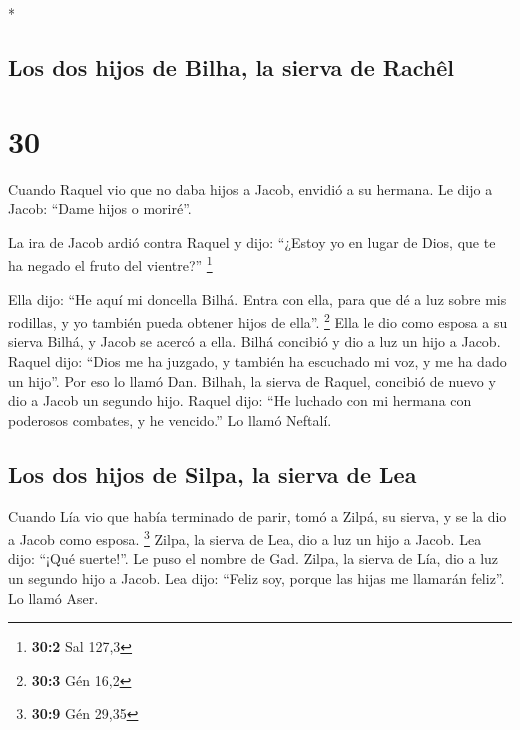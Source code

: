\begin{paracol}{2}
\begin{otherlanguage}{english}
\end{otherlanguage}

\switchcolumn[0]*

\hypertarget{los-dos-hijos-de-bilha-la-sierva-de-rachuxeal}{%
\subsection{Los dos hijos de Bilha, la sierva de
Rachêl}\label{los-dos-hijos-de-bilha-la-sierva-de-rachuxeal}}

\hypertarget{section-58}{%
\section{30}\label{section-58}}

 Cuando Raquel vio que no daba hijos a Jacob, envidió a su
hermana. Le dijo a Jacob: ``Dame hijos o moriré''.

 La ira de Jacob ardió contra Raquel y dijo: ``¿Estoy yo
en lugar de Dios, que te ha negado el fruto del vientre?'' \footnote{\textbf{30:2}
  Sal 127,3}

 Ella dijo: ``He aquí mi doncella Bilhá. Entra con ella,
para que dé a luz sobre mis rodillas, y yo también pueda obtener hijos
de ella''. \footnote{\textbf{30:3} Gén 16,2}  Ella le dio
como esposa a su sierva Bilhá, y Jacob se acercó a ella. 
Bilhá concibió y dio a luz un hijo a Jacob.  Raquel dijo:
``Dios me ha juzgado, y también ha escuchado mi voz, y me ha dado un
hijo''. Por eso lo llamó Dan.  Bilhah, la sierva de
Raquel, concibió de nuevo y dio a Jacob un segundo hijo. 
Raquel dijo: ``He luchado con mi hermana con poderosos combates, y he
vencido.'' Lo llamó Neftalí.

\hypertarget{los-dos-hijos-de-silpa-la-sierva-de-lea}{%
\subsection{Los dos hijos de Silpa, la sierva de
Lea}\label{los-dos-hijos-de-silpa-la-sierva-de-lea}}

 Cuando Lía vio que había terminado de parir, tomó a
Zilpá, su sierva, y se la dio a Jacob como esposa. \footnote{\textbf{30:9}
  Gén 29,35}  Zilpa, la sierva de Lea, dio a luz un hijo
a Jacob.  Lea dijo: ``¡Qué suerte!''. Le puso el nombre
de Gad.  Zilpa, la sierva de Lía, dio a luz un segundo
hijo a Jacob.  Lea dijo: ``Feliz soy, porque las hijas me
llamarán feliz''. Lo llamó Aser.


\end{paracol}

